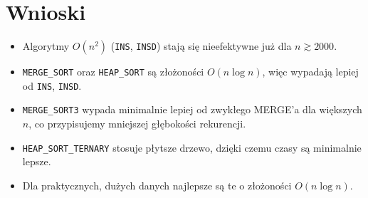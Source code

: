 \documentclass{article}
\begin{document}
	\section{Wnioski}
	\begin{itemize}
		\item Algorytmy $O(n^2)$ (\texttt{INS}, \texttt{INSD}) stają się nieefektywne już dla $n \gtrsim 2000$.
		\item \texttt{MERGE\_SORT} oraz \texttt{HEAP\_SORT} są złożoności $O(n\log n)$, więc wypadają lepiej od \texttt{INS}, \texttt{INSD}.
		\item \texttt{MERGE\_SORT3} wypada minimalnie lepiej od zwykłego MERGE'a dla większych $n$, co przypisujemy mniejszej głębokości rekurencji.
		\item \texttt{HEAP\_SORT\_TERNARY} stosuje płytsze drzewo, dzięki czemu czasy są minimalnie lepsze.
		\item Dla praktycznych, dużych danych najlepsze są te o złożoności $O(n\log n)$.
	\end{itemize}
	
\end{document}
